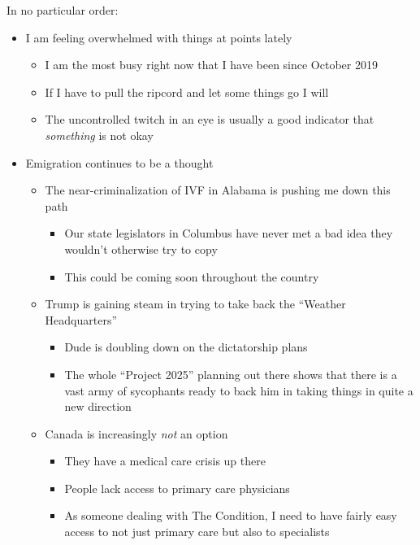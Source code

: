 In no particular order:

\begin{itemize}
\tightlist
\item
  I am feeling overwhelmed with things at points lately

  \begin{itemize}
  \tightlist
  \item
    I am the most busy right now that I have been since October 2019
  \item
    If I have to pull the ripcord and let some things go I will
  \item
    The uncontrolled twitch in an eye is usually a good indicator that
    \emph{something} is not okay
  \end{itemize}
\item
  Emigration continues to be a thought

  \begin{itemize}
  \tightlist
  \item
    The near-criminalization of IVF in Alabama is pushing me down this
    path

    \begin{itemize}
    \tightlist
    \item
      Our state legislators in Columbus have never met a bad idea they
      wouldn't otherwise try to copy
    \item
      This could be coming soon throughout the country
    \end{itemize}
  \item
    Trump is gaining steam in trying to take back the ``Weather
    Headquarters''

    \begin{itemize}
    \tightlist
    \item
      Dude is doubling down on the dictatorship plans
    \item
      The whole ``Project 2025'' planning out there shows that there is
      a vast army of sycophants ready to back him in taking things in
      quite a new direction
    \end{itemize}
  \item
    Canada is increasingly \emph{not} an option

    \begin{itemize}
    \tightlist
    \item
      They have a medical care crisis up there
    \item
      People lack access to primary care physicians
    \item
      As someone dealing with The Condition, I need to have fairly easy
      access to not just primary care but also to specialists


\end{itemize}
\end{itemize}
\end{itemize}
